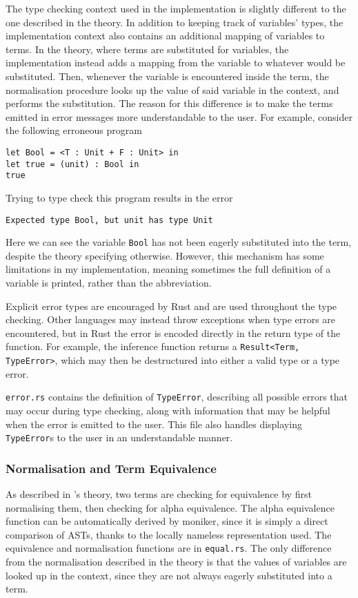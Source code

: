 \documentclass[12pt,a4paper,twoside]{report}
\begin{document}
The type checking context used in the implementation is slightly different to the one described in the theory.
In addition to keeping track of variables' types, the implementation context also contains an additional mapping of variables to terms.
In the theory, where terms are substituted for variables, the implementation instead adds a mapping from the variable to whatever would be substituted.
Then, whenever the variable is encountered inside the term, the normalisation procedure looks up the value of said variable in the context, and performs the substitution.
The reason for this difference is to make the terms emitted in error messages more understandable to the user.
For example, consider the following erroneous program
\begin{lstlisting}
let Bool = <T : Unit + F : Unit> in
let true = (unit) : Bool in
true
\end{lstlisting}
Trying to type check this program results in the error
\begin{lstlisting}
Expected type Bool, but unit has type Unit
\end{lstlisting}
Here we can see the variable \lstinline{Bool} has not been eagerly substituted into the term, despite the theory specifying otherwise.
However, this mechanism has some limitations in my implementation, meaning sometimes the full definition of a variable is printed, rather than the abbreviation.

Explicit error types are encouraged by Rust and are used throughout the type checking.
Other languages may instead throw exceptions when type errors are encountered, but in Rust the error is encoded directly in the return type of the function.
For example, the inference function returns a \texttt{Result<Term, TypeError>}, which may then be destructured into either a valid type or a type error.

\texttt{error.rs} contains the definition of \texttt{TypeError}, describing all possible errors that may occur during type checking, along with information that may be helpful when the error is emitted to the user.
This file also handles displaying \texttt{TypeError}s to the user in an understandable manner.

\subsubsection{Normalisation and Term Equivalence}

As described in \pimu{}'s theory, two terms are checking for equivalence by first normalising them, then checking for alpha equivalence.
The alpha equivalence function can be automatically derived by moniker, since it is simply a direct comparison of ASTs, thanks to the locally nameless representation used.
The equivalence and normalisation functions are in \texttt{equal.rs}.
The only difference from the normalisation described in the theory is that the values of variables are looked up in the context, since they are not always eagerly substituted into a term.
\end{document}
